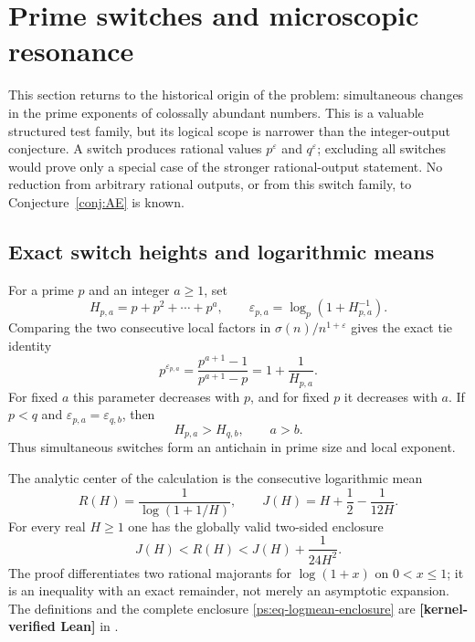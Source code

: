 \documentclass[11pt,oneside]{article}
\theoremstyle{definition}
\theoremstyle{remark}
\newcommand{\lean}[1]{\texttt{\detokenize{#1}}}
\newcommand{\statuslean}{\textcolor{leanblue}{\textbf{[kernel-verified Lean]}}}
\begin{document}
\section{Prime switches and microscopic resonance}
\label{sec:prime-switches}

This section returns to the historical origin of the problem: simultaneous changes in the
prime exponents of
colossally abundant numbers.  This is a valuable structured test family, but its logical
scope is narrower than the integer-output conjecture.  A switch produces rational values
$p^\varepsilon$ and $q^\varepsilon$; excluding all switches would prove only a special case
of the stronger rational-output statement.  No reduction from arbitrary rational outputs,
or from this switch family, to Conjecture~\ref{conj:AE} is known.

\subsection{Exact switch heights and logarithmic means}
\label{ps:switch-logmean}

For a prime $p$ and an integer $a\ge1$, set
\begin{equation}
 H_{p,a}=p+p^2+\cdots+p^a,
 \qquad
 \varepsilon_{p,a}=\log_p(1+H_{p,a}^{-1}).
 \label{ps:eq-switch-height}
\end{equation}
Comparing the two consecutive local factors in
$\sigma(n)/n^{1+\varepsilon}$ gives the exact tie identity
\begin{equation}
 p^{\varepsilon_{p,a}}=
 \frac{p^{a+1}-1}{p^{a+1}-p}
 =1+\frac1{H_{p,a}}.
 \label{ps:eq-switch-output}
\end{equation}
For fixed $a$ this parameter decreases with $p$, and for fixed $p$ it decreases with $a$.
If $p<q$ and $\varepsilon_{p,a}=\varepsilon_{q,b}$, then
\begin{equation}
 H_{p,a}>H_{q,b},\qquad a>b.
 \label{ps:eq-antichain}
\end{equation}
Thus simultaneous switches form an antichain in prime size and local exponent.

The analytic center of the calculation is the consecutive logarithmic mean
\[
 R(H)=\frac1{\log(1+1/H)},
 \qquad
 J(H)=H+\frac12-\frac1{12H}.
\]
For every real $H\ge1$ one has the globally valid two-sided enclosure
\begin{equation}
 J(H)<R(H)<J(H)+\frac1{24H^2}.
 \label{ps:eq-logmean-enclosure}
\end{equation}
The proof differentiates two rational majorants for $\log(1+x)$ on $0<x\le1$; it is an
inequality with an exact remainder, not merely an asymptotic expansion.  The definitions and
the complete enclosure \eqref{ps:eq-logmean-enclosure} are \statuslean{} in
\lean{ConsecutiveLogMeanBounds}.
\end{document}
